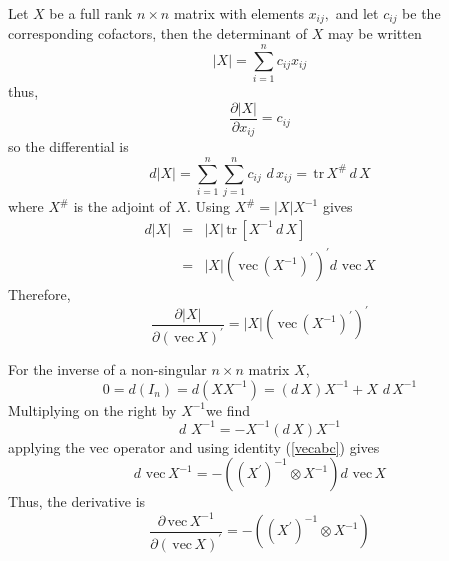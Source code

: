 \documentclass[12pt,thmsa,suthesis,verbatim]{report}
\begin{document}
Let $X$ be a full rank $n\times n$ matrix with elements $x_{ij},$ and let $%
c_{ij}$ be the corresponding cofactors, then the determinant of $X$ may be
written 
\begin{equation}
\left| X\right| =\sum_{i=1}^nc_{ij}x_{ij}
\end{equation}
thus, 
\begin{equation}
\frac{\partial \left| X\right| }{\partial x_{ij}}=c_{ij}
\end{equation}
so the differential is 
\begin{equation}
d\left| X\right| =\sum_{i=1}^n\sum_{j=1}^nc_{ij}\,\,d\,x_{ij}=\,\mathrm{tr}%
\,X^{\#}\,d\,X
\end{equation}
where $X^{\#}$ is the adjoint of $X$. Using $X^{\#}=\left| X\right| X^{-1}$
gives 
\begin{eqnarray}
d\left| X\right| &=&\left| X\right| \,\mathrm{tr}\,\left[ X^{-1}\,d\,X\right]
\nonumber \\
&=&\left| X\right| \left( \,\mathrm{vec}\,\left( X^{-1}\right) ^{\prime
}\right) ^{\prime }d\,\,\mathrm{vec}\,X
\end{eqnarray}
Therefore, 
\begin{equation}
\frac{\partial \left| X\right| }{\partial \left( \,\mathrm{vec}\,X\right)
^{\prime }}=\left| X\right| \left( \,\mathrm{vec}\,\left( X^{-1}\right)
^{\prime }\right) ^{\prime }
\end{equation}

For the inverse of a non-singular $n\times n$ matrix $X$, 
\begin{equation}
0=d\left( I_n\right) =d\left( XX^{-1}\right) =\left( d\,X\right)
X^{-1}+X\,\,d\,X^{-1}
\end{equation}
Multiplying on the right by $X^{-1}$we find 
\begin{equation}
d\,\,X^{-1}=-X^{-1}\left( d\,X\right) X^{-1}
\end{equation}
applying the vec operator and using identity (\ref{vecabc}) gives 
\begin{equation}
d\,\,\mathrm{vec}\,X^{-1}=-\left( \left( X^{\prime }\right) ^{-1}\otimes
X^{-1}\right) d\,\,\mathrm{vec}\,X
\end{equation}
Thus, the derivative is 
\begin{equation}
\frac{\partial \,\mathrm{vec}\,X^{-1}}{\partial \left( \,\mathrm{vec}%
\,X\right) ^{\prime }}=-\left( \left( X^{\prime }\right) ^{-1}\otimes
X^{-1}\right)
\end{equation}
\end{document}
